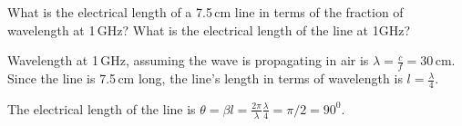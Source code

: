 \documentclass{ximera}
\begin{document}
\begin{example}
What is the electrical length of a 7.5\,cm line in terms of the fraction of wavelength at 1\,GHz? What is the electrical length of the line at 1GHz?
\begin{explanation}
Wavelength at 1\,GHz, assuming the wave is propagating in air is $\lambda=\frac{c}{f}=30$\,cm. Since the line is 7.5\,cm long, the line's length in terms of wavelength is $l=\frac{\lambda}{4}$.

The electrical length of the line is $\theta=\beta l = \frac{2 \pi}{\lambda} \frac{\lambda}{4} =  \pi/2 = 90^0$.


\end{explanation}

\end{example}
\end{document}
